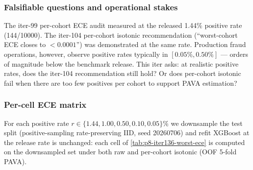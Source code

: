 
\subsubsection{Falsifiable questions and operational stakes}

The iter-99 per-cohort ECE audit measured at the released 1.44\% positive
rate (144/10000). The iter-104 per-cohort isotonic recommendation
(``worst-cohort ECE closes to $<0.0001$'') was demonstrated at the same
rate. Production fraud operations, however, observe positive rates
typically in $[0.05\%, 0.50\%]$ --- orders of magnitude below the
benchmark release. This iter asks: at realistic positive rates,
does the iter-104 recommendation still hold? Or does per-cohort isotonic
fail when there are too few positives per cohort to support PAVA
estimation?

\subsubsection{Per-cell ECE matrix}

For each positive rate $r \in \{1.44, 1.00, 0.50, 0.10, 0.05\}$\% we
downsample the test split (positive-sampling rate-preserving IID, seed
20260706) and refit XGBoost at the release rate is unchanged: each cell
of \eqref{tab:p8-iter136-worst-ece} is computed on the downsampled set
under both raw and per-cohort isotonic (OOF 5-fold PAVA).


